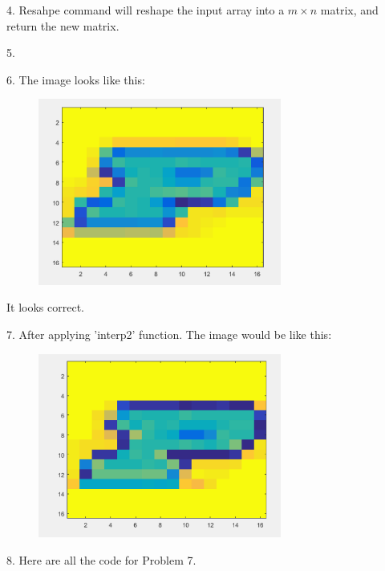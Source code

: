 \documentclass{article}
\begin{document}
4.  Resahpe command will reshape the input array into a $m\times n$ matrix, and return the new matrix. 


5. 

6.  The image looks like this: 
\begin{figure} [h]
\includegraphics[width=8cm]{reduced}

\end{figure}
It looks correct. 

7. After applying 'interp2' function.  The image would be like this: 
\begin{figure} [h]
\includegraphics[width=8cm]{interp2}

\end{figure}

8.  Here are all the code for Problem 7. 
\end{document}

